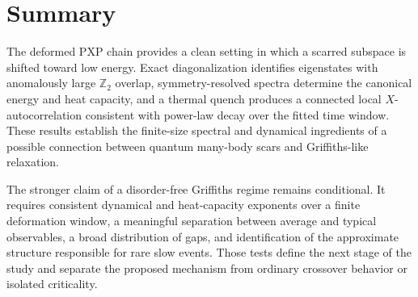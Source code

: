 \documentclass[11pt]{article}
\newcommand{\Ztwo}{\mathbb{Z}_2}
\begin{document}
\section{Summary}

The deformed PXP chain provides a clean setting in which a scarred subspace is shifted
toward low energy. Exact diagonalization identifies eigenstates with anomalously
large $\Ztwo$ overlap, symmetry-resolved spectra determine the canonical energy and
heat capacity, and a thermal quench produces a connected local $X$-autocorrelation
consistent with power-law decay over the fitted time window. These results establish
the finite-size spectral and dynamical ingredients of a possible connection between
quantum many-body scars and Griffiths-like relaxation.

The stronger claim of a disorder-free Griffiths regime remains conditional. It
requires consistent dynamical and heat-capacity exponents over a finite deformation
window, a meaningful separation between average and typical observables, a broad
distribution of gaps, and identification of the approximate structure responsible
for rare slow events. Those tests define the next stage of the study and separate the
proposed mechanism from ordinary crossover behavior or isolated criticality.
\end{document}
